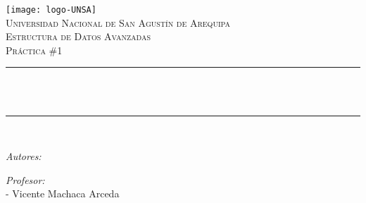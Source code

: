 \begin{titlepage}

\centering
\texttt{[image: logo-UNSA]}\\[1.0 cm]
\textsc{\LARGE Universidad Nacional de San Agustín de Arequipa}\\[2.0 cm]
\textsc{\Large Estructura de Datos Avanzadas}\\[0.5 cm]
\textsc{\large Práctica \#1}\\[0.5 cm]
\rule{\linewidth}{0.2 mm} \\[0.4 cm]
{ \huge \bfseries \thetitle}\\
\rule{\linewidth}{0.2 mm} \\[1.5 cm]

\begin{flushleft} \large
  \emph{Autores:}\\
\theauthor
\end{flushleft}

\begin{flushleft} \large
  \emph{Profesor:}\\
  - Vicente Machaca Arceda \\
\end{flushleft}

\vfill

{\large \thedate}

\end{titlepage}

